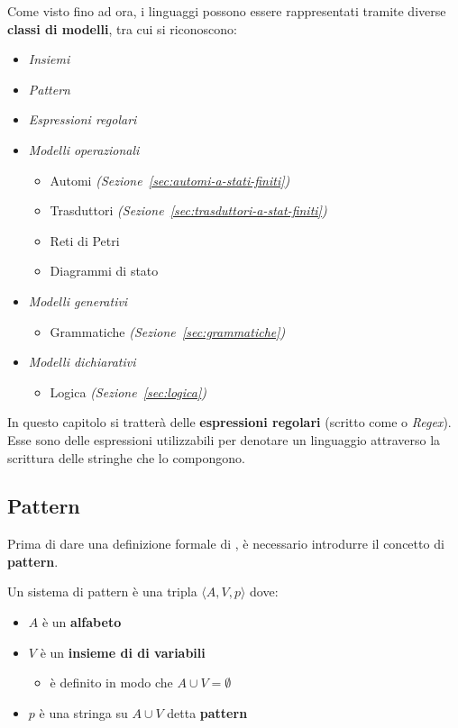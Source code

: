 \documentclass[italian, 10pt]{article}
\begin{document}
Come visto fino ad ora, i linguaggi possono essere rappresentati tramite diverse \textbf{classi di modelli}, tra cui si riconoscono:

\begin{itemize}
  \item \textit{Insiemi}
  \item \textit{Pattern}
  \item \textit{Espressioni regolari}
  \item \textit{Modelli operazionali}
        \begin{itemize}
          \item Automi \textit{(Sezione~\ref{sec:automi-a-stati-finiti})}
          \item Trasduttori \textit{(Sezione~\ref{sec:trasduttori-a-stat-finiti})}
          \item Reti di Petri
          \item Diagrammi di stato
        \end{itemize}
  \item \textit{Modelli generativi}
        \begin{itemize}
          \item Grammatiche \textit{(Sezione~\ref{sec:grammatiche})}
        \end{itemize}
  \item \textit{Modelli dichiarativi}
        \begin{itemize}
          \item Logica \textit{(Sezione~\ref{sec:logica})}
        \end{itemize}
\end{itemize}

In questo capitolo si tratterà delle \textbf{espressioni regolari} (scritto come \RE o \textit{Regex}).
Esse sono delle espressioni utilizzabili per denotare un linguaggio attraverso la scrittura delle stringhe che lo compongono.

\subsection{Pattern}

Prima di dare una definizione formale di \RE, è necessario introdurre il concetto di \textbf{pattern}.

\bigskip
Un sistema di pattern è una tripla \(\langle A, V, p \rangle\) dove:

\begin{itemize}
  \item \(A\) è un \textbf{alfabeto}
  \item \(V\) è un \textbf{insieme di di variabili}
        \begin{itemize}[label=\(\rightarrow\)]
          \item è definito in modo che \(A \cup V = \emptyset\)
        \end{itemize}
  \item \(p\) è una stringa su \(A \cup V\) detta \textbf{pattern}
\end{itemize}
\end{document}
